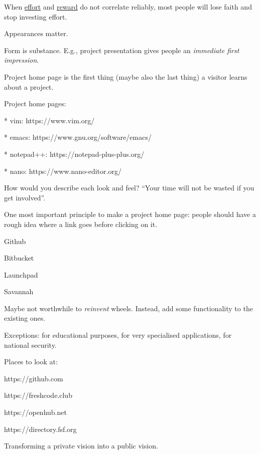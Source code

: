 \documentclass[landscape,30pt]{foils}
\begin{document}
When \underline{effort} and \underline{reward} do not correlate reliably, most people will lose faith and stop investing effort.


Appearances matter.

Form is substance.  E.g., project presentation gives people an {\em immediate first impression}.

Project home page is the first thing (maybe also the last thing) a visitor learns about a project.

Project home pages:

* vim: https://www.vim.org/

* emacs: https://www.gnu.org/software/emacs/

* notepad++: https://notepad-plus-plus.org/

* nano: https://www.nano-editor.org/

How would you describe each look and feel?  ``Your time will not be wasted if you get involved''.

One most important principle to make a project home page: people should have a rough idea where a link goes before clicking on it.


Github

Bitbucket

Launchpad

Savannah



Maybe not worthwhile to {\em reinvent} wheels.  Instead, add some functionality to the existing ones.

Exceptions: for educational purposes, for very specialised applications, for national security.

Places to look at:

https://github.com

https://freshcode.club

https://openhub.net

https://directory.fsf.org



Transforming a private vision into a public vision.
\end{document}
